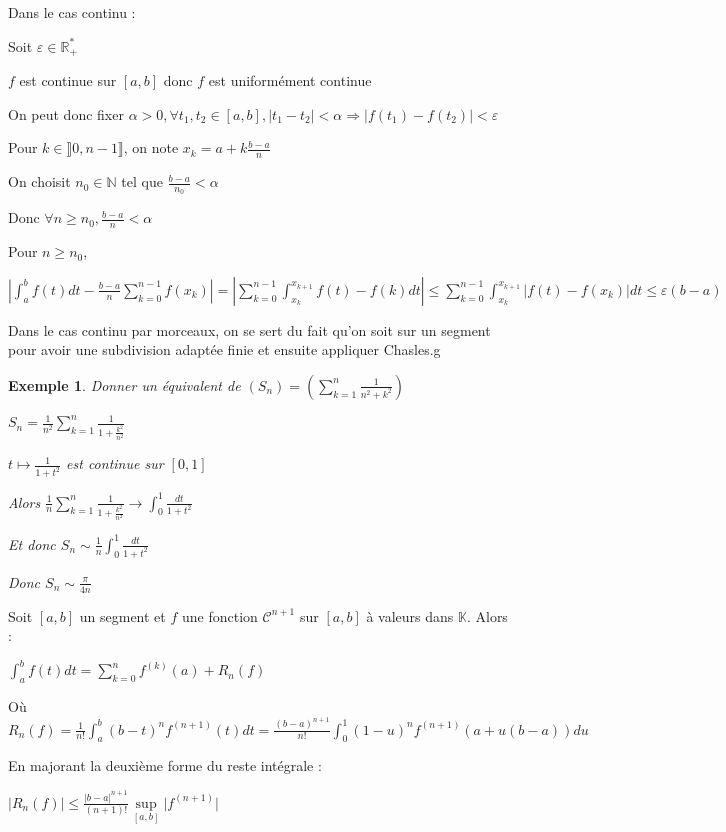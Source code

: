 \documentclass[a4paper,12pt]{book}
\newcommand{\Prop}[2]{\begin{tcolorbox}[sharp corners, colback=white,colframe=red!90!black!75, title=Proposition : #1]#2\end{tcolorbox}}
\newcommand{\Pre}[1]{\begin{tcolorbox}[sharp corners, colback=white,colframe=green!60!green!30!black!75, title=Preuve]#1\end{tcolorbox}}
\newtheorem{Exe}{Exemple}[section]
\def\R{\mathbb{R}}
\def\N{\mathbb{N}}
\def\K{\mathbb{K}}
\begin{document}
\Pre{Dans le cas continu : \par Soit $\varepsilon\in\R_+^*$ \par $f$ est continue sur $[a,b]$ donc $f$ est uniformément continue \par On peut donc fixer $\alpha>0, \forall t_1,t_2\in[a,b], \vert t_1-t_2\vert<\alpha \Rightarrow \vert f(t_1)-f(t_2)\vert<\varepsilon$ \par \par Pour $k\in\rrbracket 0, n-1\rrbracket$, on note $x_k = a+k\frac{b-a}{n}$ \par On choisit $n_0\in \N$ tel que $\frac{b-a}{n_0}<\alpha$ \par Donc $\forall n\geq n_0, \frac{b-a}{n}<\alpha$
\par Pour $n\geq n_0$, \par $\left\vert\int_a^bf(t)dt-\frac{b-a}{n}\sum\limits_{k=0}^{n-1}f(x_k)\right\vert = \left\vert\sum\limits_{k=0}^{n-1}\int_{x_k}^{x_{k+1}}f(t)-f(k)dt\right\vert\leq \sum\limits_{k=0}^{n-1}\int_{x_k}^{x_{k+1}}\vert f(t)-f(x_k)\vert dt\leq\varepsilon(b-a)$ \par Dans le cas continu par morceaux, on se sert du fait qu'on soit sur un segment pour avoir une subdivision adaptée finie et ensuite appliquer Chasles.g}
\begin{Exe}
Donner un équivalent de $(S_n) = \left(\sum\limits_{k=1}^n\frac{1}{n^2+k^2}\right)$ \par $S_n = \frac{1}{n^2}\sum\limits_{k=1}^n\frac{1}{1+\frac{k^2}{n^2}}$ \par $t\mapsto \frac{1}{1+t^2}$ est continue sur $[0,1]$ \par Alors $\frac{1}{n}\sum\limits_{k=1}^n\frac{1}{1+\frac{k^2}{n^2}}\to\int_0^1\frac{dt}{1+t^2}$ \par Et donc $S_n\sim \frac{1}{n}\int_0^1\frac{dt}{1+t^2}$ \par Donc $S_n\sim \frac{\pi}{4n}$
\end{Exe}
\Prop{formule de Taylor avec reste intégral et majoration de Lagrange}{Soit $[a,b]$ un segment et $f$ une fonction $\mathcal{C}^{n+1}$ sur $[a,b]$ à valeurs dans $\K$. Alors : \par \begin{center}$\int_a^bf(t)dt=\sum\limits_{k=0}^nf^{(k)}(a)+R_n(f)$ \end{center} \par Où $R_n(f) =\frac{1}{n!}\int_a^b(b-t)^nf^{(n+1)}(t)dt = \frac{(b-a)^{n+1}}{n!}\int_0^1(1-u)^nf^{(n+1)}(a+u(b-a))du$ \par En majorant la deuxième forme du reste intégrale : \par \begin{center} $\vert R_n(f)\vert \leq \frac{\vert b-a\vert^{n+1}}{(n+1)!}\sup\limits_{[a,b]}\vert f^{(n+1)}\vert$\end{center}}
\end{document}
